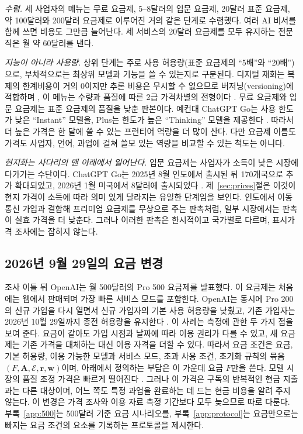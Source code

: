 \documentclass[11pt]{article}
\theoremstyle{definition}
\theoremstyle{remark}
\begin{document}
\emph{수렴.} 세 사업자의 메뉴는 무료 요금제, 5--8달러의 입문 요금제, 20달러 표준 요금제, 약 100달러와 200달러 요금제로 이루어진 거의 같은 단계로 수렴했다. 여러 AI 비서를 함께 쓰면 비용도 그만큼 늘어난다. 세 서비스의 20달러 요금제를 모두 유지하는 전문직은 월 약 60달러를 낸다.

\emph{지능이 아니라 사용량.} 상위 단계는 주로 사용 허용량(표준 요금제의 ``5배''와 ``20배'')으로, 부차적으로는 최상위 모델과 기능을 쓸 수 있는지로 구분된다. 디지털 재화는 복제의 한계비용이 거의 0이지만 추론 비용은 무시할 수 없으므로 버저닝(versioning)에 적합하며 \citep{goldfarb2019digital}, 이 메뉴는 수량과 품질에 따른 2급 가격차별의 전형이다 \citep{mussa1978monopoly}. 무료 요금제와 입문 요금제는 표준 요금제의 품질을 낮춘 판본이다. 예컨대 ChatGPT Go는 사용 한도가 낮은 ``Instant'' 모델을, Plus는 한도가 높은 ``Thinking'' 모델을 제공한다 \citep{openai2026go}. 따라서 더 높은 가격은 한 달에 쓸 수 있는 프런티어 역량을 더 많이 산다. 다만 요금제 이름도 가격도 사업자, 언어, 과업에 걸쳐 쓸모 있는 역량을 비교할 수 있는 척도는 아니다.

\emph{현지화는 사다리의 맨 아래에서 일어난다.} 입문 요금제는 사업자가 소득이 낮은 시장에 다가가는 수단이다. ChatGPT Go는 2025년 8월 인도에서 출시된 뒤 170개국으로 추가 확대되었고, 2026년 1월 미국에서 8달러에 출시되었다 \citep{openai2026go}. 제~\ref{sec:prices}절은 이것이 현지 가격이 소득에 따라 의미 있게 달라지는 유일한 단계임을 보인다. 인도에서 이동통신 가입과 결합해 프리미엄 요금제를 무상으로 주는 판촉처럼, 일부 시장에서는 판촉이 실효 가격을 더 낮춘다. 그러나 이러한 판촉은 한시적이고 국가별로 다르며, 표시가격 조사에는 잡히지 않는다.

\subsection{2026년 9월 29일의 요금 변경}\label{sec:tariff}

조사 이틀 뒤 OpenAI는 월 500달러의 Pro 500 요금제를 발표했다. 이 요금제는 처음에는 웹에서 판매되며 가장 빠른 서비스 모드를 포함한다. OpenAI는 동시에 Pro 200의 신규 가입을 다시 열면서 신규 가입자의 기본 사용 허용량을 낮췄고, 기존 가입자는 2026년 10월 29일까지 종전 허용량을 유지한다 \citep{openai2026releasenotes,openai2026prorevision}. 이 사례는 측정에 관한 두 가지 점을 보여 준다. 요금이 같아도 가입 시점과 날짜에 따라 이용 권리가 다를 수 있고, 새 요금제는 기존 가격을 대체하는 대신 이용 자격을 더할 수 있다. 따라서 요금 조건은 요금, 기본 허용량, 이용 가능한 모델과 서비스 모드, 초과 사용 조건, 초기화 규칙의 묶음 $(F,\mathbf{A},\mathcal{E},\mathbf{r},\mathbf{w})$이며, 아래에서 정의하는 부담은 이 가운데 요금 $F$만을 쓴다. 모델 시장의 품질 조정 가격은 빠르게 떨어진다 \citep{andre2025markets}. 그러나 이 가격은 구독의 반복적인 현금 지출과는 다른 대상이며, 어느 쪽도 특정 과업을 완료하는 데 드는 현금 비용을 알려 주지 않는다. 이 변경은 가격 조사와 이용 자료 측정 기간보다 모두 늦으므로 따로 다룬다. 부록~\ref{app:500}는 500달러 기준 요금 시나리오를, 부록~\ref{app:protocol}는 요금만으로는 빠지는 요금 조건의 요소를 기록하는 프로토콜을 제시한다.
\end{document}
